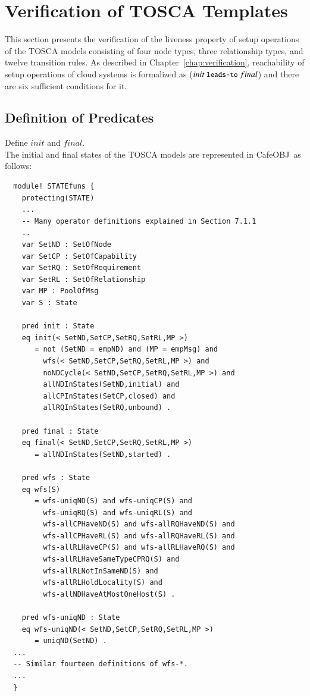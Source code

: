 \documentclass[12pt]{report}
\newcommand{\mbstt}[1]{\mbox{\small{\tt {#1}}}}
\newcommand{\cafeobj}{{\sf CafeOBJ}~}
\begin{document}
\section{Verification of TOSCA Templates}
\label{sec:TOSCAverification}
This section presents the verification of the liveness property of
setup operations of the TOSCA models consisting of four node types,
three relationship types, and twelve transition rules. As described in
Chapter~\ref{chap:verification}, reachability of setup operations of
cloud systems is formalized as ($init~\mbstt{leads-to}~final$) and
there are six sufficient conditions for it.

\subsection{Definition of Predicates}
\label{sec:TOSCAsupport}
 Define $init$ and $final$. \\
The initial and final states of the TOSCA models are represented in
\cafeobj as follows:
\small
\begin{verbatim}
  module! STATEfuns {
    protecting(STATE)
    ...
    -- Many operator definitions explained in Section 7.1.1
    ..
    var SetND : SetOfNode
    var SetCP : SetOfCapability
    var SetRQ : SetOfRequirement
    var SetRL : SetOfRelationship
    var MP : PoolOfMsg
    var S : State
  
    pred init : State
    eq init(< SetND,SetCP,SetRQ,SetRL,MP >)
       = not (SetND = empND) and (MP = empMsg) and
         wfs(< SetND,SetCP,SetRQ,SetRL,MP >) and
         noNDCycle(< SetND,SetCP,SetRQ,SetRL,MP >) and
         allNDInStates(SetND,initial) and 
         allCPInStates(SetCP,closed) and 
         allRQInStates(SetRQ,unbound) .
  
    pred final : State
    eq final(< SetND,SetCP,SetRQ,SetRL,MP >)
       = allNDInStates(SetND,started) .
  
    pred wfs : State
    eq wfs(S)
       = wfs-uniqND(S) and wfs-uniqCP(S) and 
         wfs-uniqRQ(S) and wfs-uniqRL(S) and
         wfs-allCPHaveND(S) and wfs-allRQHaveND(S) and 
         wfs-allCPHaveRL(S) and wfs-allRQHaveRL(S) and 
         wfs-allRLHaveCP(S) and wfs-allRLHaveRQ(S) and 
         wfs-allRLHaveSameTypeCPRQ(S) and
         wfs-allRLNotInSameND(S) and
         wfs-allRLHoldLocality(S) and
         wfs-allNDHaveAtMostOneHost(S) .
  
    pred wfs-uniqND : State
    eq wfs-uniqND(< SetND,SetCP,SetRQ,SetRL,MP >)
       = uniqND(SetND) .
  ...
  -- Similar fourteen definitions of wfs-*.  
  ...
  }
\end{verbatim}
\normalsize
\end{document}
